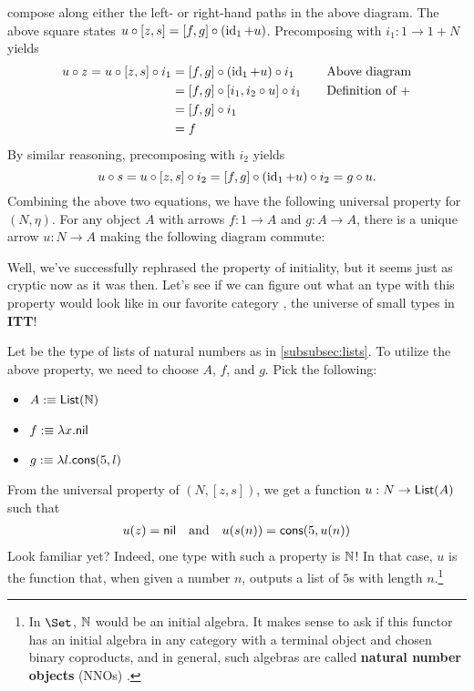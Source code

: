 \documentclass[12pt,twoside,draft]{reedthesis}
\makeatletter
\let\oldindex\index
\renewcommand{\index}[1]{\oldindex{#1}\marginpar{\footnotesize\color{index}index: #1}}
\newcommand{\indeX}[1]{\oldindex{#1}}
\newcommand{\abbreviation}[1]{\textbf{#1}\indeX{#1@\textbf{#1}}} %
\newcommand{\define}[1]{\textbf{#1}} %
\makeatother
\begin{document}
\begin{example}
  compose along either the left- or right-hand paths in the above diagram.
  The above square states $u\circ [z,s]= [f,g]\circ (\operatorname{id}_1+u)$. Precomposing
  with $i_1:1\to 1+N$ yields
  \begin{align*}
    u\circ z = u\circ [z,s]\circ i_1
    &= [f,g]\circ (\operatorname{id}_1+u) \circ i_1 
    &&\quad\text{Above diagram} \\
    &= [f,g]\circ [i_1,i_2\circ u] \circ i_1 
    &&\quad\text{Definition of }+ \\
    &= [f, g]\circ i_1 \\
    &= f
  \end{align*}
  By similar reasoning, precomposing with $i_2$ yields
  \begin{equation*}
    u\circ s = u\circ [z,s] \circ i_2
    = [f,g]\circ(\operatorname{id}_1+u)\circ i_2
    = g\circ u.
  \end{equation*}
  Combining the above two equations, we have the following universal property
  for $(N,\eta)$. For any object $A$ with arrows $f:1\to A$ and $g:A\to A$,
  there is a unique arrow $u:N\to A$ making the following diagram commute:
  \begin{center}
  \end{center}
  Well, we've successfully rephrased the property of initiality, but it seems
  just as cryptic now as it was then. Let's see if we can figure out what an
  type with this property would look like in our favorite category \universe, the
  universe of small types in \abbreviation{ITT}!

  Let \List{\N} be the type of lists of natural numbers
  as in \cref{subsubsec:lists}. To utilize the above property, we need
  to choose $A$, $f$, and $g$. Pick the following:
  \begin{itemize}
    \itemsep0em
    \item $A:\equiv \mathsf{List}(\mathbb{N})$
    \item $f:\equiv \lambda x.\mathsf{nil}$
    \item $g:\equiv \lambda l.\mathsf{cons}(5,l)$
  \end{itemize}
  From the universal property of $(N,[z,s])$, we get a function
  $u:N\to \mathsf{List}(A)$ such that
  \begin{align*}
    u(z) = \mathsf{nil}
    &&\text{and}&&
    u(s(n)) = \mathsf{cons}(5, u(n))
  \end{align*}
  Look familiar yet? Indeed, one type with such a property is $\mathbb{N}$! In that
  case, $u$ is the function that, when given a number $n$, outputs a list of $5$s
  with length $n$.\footnote{In $\Set$, $\mathbb{N}$ would be an initial algebra.
    It makes sense to ask if this functor has an initial algebra in any
    category with a terminal object and chosen binary coproducts, and in
    general, such algebras are called \define{natural number objects} (NNOs) 
    \cite{sketches}.
  }
\end{example}
\end{document}
